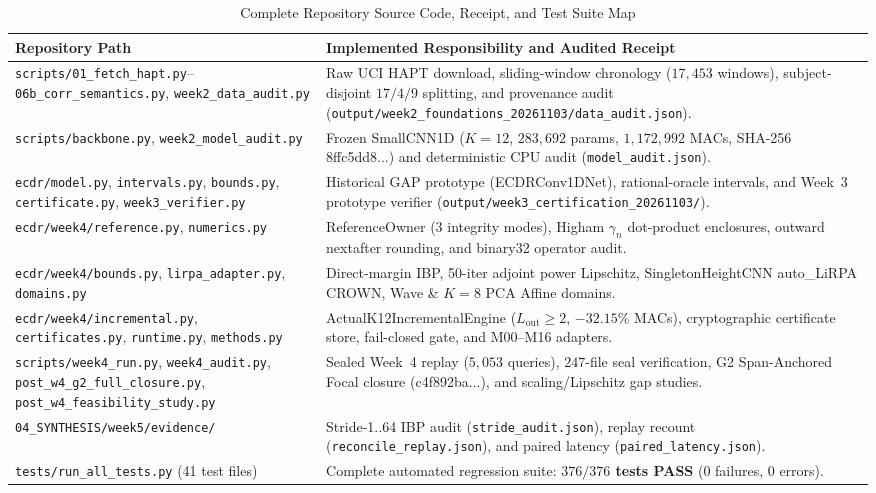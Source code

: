 \documentclass[11pt,oneside,a4paper]{report}
\newcommand{\code}[1]{{\small\upshape\ttfamily #1}}
\theoremstyle{remark}
\begin{document}
\begin{table}[htbp]
\centering\footnotesize
\caption{Complete Repository Source Code, Receipt, and Test Suite Map}
\label{tab:app_sourcemap}
\begin{tabularx}{\textwidth}{@{}P{5.8cm}Y@{}}
\toprule
\textbf{Repository Path} & \textbf{Implemented Responsibility and Audited Receipt} \\
\midrule
\nolinkurl{scripts/01_fetch_hapt.py}--\nolinkurl{06b_corr_semantics.py}, \nolinkurl{week2_data_audit.py} & Raw UCI HAPT download, sliding-window chronology ($17,453$ windows), subject-disjoint $17/4/9$ splitting, and provenance audit (\nolinkurl{output/week2_foundations_20261103/data_audit.json}). \\
\nolinkurl{scripts/backbone.py}, \nolinkurl{week2_model_audit.py} & Frozen \code{SmallCNN1D} ($K=12$, $283,692$ params, $1,172,992$ MACs, SHA-256 \code{8ffc5dd8...}) and deterministic CPU audit (\nolinkurl{model_audit.json}). \\
\nolinkurl{ecdr/model.py}, \nolinkurl{intervals.py}, \nolinkurl{bounds.py}, \nolinkurl{certificate.py}, \nolinkurl{week3_verifier.py} & Historical GAP prototype (\code{ECDRConv1DNet}), rational-oracle intervals, and Week~3 prototype verifier (\nolinkurl{output/week3_certification_20261103/}). \\
\nolinkurl{ecdr/week4/reference.py}, \nolinkurl{numerics.py} & \code{ReferenceOwner} (3 integrity modes), Higham $\gamma_n$ dot-product enclosures, outward \code{nextafter} rounding, and \code{binary32} operator audit. \\
\nolinkurl{ecdr/week4/bounds.py}, \nolinkurl{lirpa_adapter.py}, \nolinkurl{domains.py} & Direct-margin IBP, 50-iter adjoint power Lipschitz, \code{SingletonHeightCNN} \code{auto\_LiRPA} CROWN, Wave \& $K=8$ PCA Affine domains. \\
\nolinkurl{ecdr/week4/incremental.py}, \nolinkurl{certificates.py}, \nolinkurl{runtime.py}, \nolinkurl{methods.py} & \code{ActualK12IncrementalEngine} ($L_{\text{out}}\ge 2$, $-32.15\%$ MACs), cryptographic certificate store, fail-closed gate, and \code{M00}--\code{M16} adapters. \\
\nolinkurl{scripts/week4_run.py}, \nolinkurl{week4_audit.py}, \nolinkurl{post_w4_g2_full_closure.py}, \nolinkurl{post_w4_feasibility_study.py} & Sealed Week~4 replay ($5,053$ queries), $247$-file seal verification, G2 Span-Anchored Focal closure (\code{c4f892ba...}), and scaling/Lipschitz gap studies. \\
\nolinkurl{04_SYNTHESIS/week5/evidence/} & Stride-1..64 IBP audit (\nolinkurl{stride_audit.json}), replay recount (\nolinkurl{reconcile_replay.json}), and paired latency (\nolinkurl{paired_latency.json}). \\
\nolinkurl{tests/run_all_tests.py} (41 test files) & Complete automated regression suite: \textbf{$376/376$ tests PASS} ($0$ failures, $0$ errors). \\
\bottomrule
\end{tabularx}
\end{table}
\end{document}
